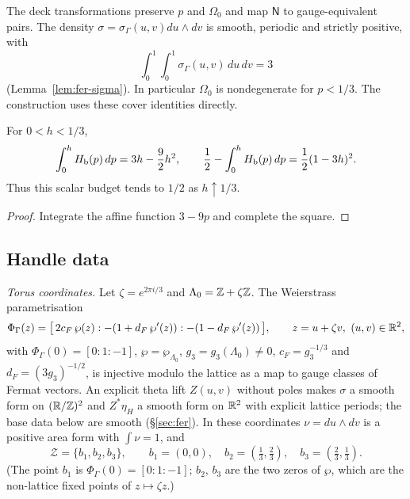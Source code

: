 The deck transformations preserve $p$ and $\Omega_0$ and map $\mathsf N$ to gauge-equivalent pairs.
The density $\sigma=\sigma_\Gamma(u,v)du\wedge dv$ is smooth, periodic and strictly positive, with
\[
 \int_0^1\int_0^1\sigma_\Gamma(u,v)\,du\,dv=3
\]
(Lemma~\ref{lem:fer-sigma}). In particular $\Omega_0$ is nondegenerate for $p<1/3$.
The construction uses these cover identities directly.

\begin{lemma}\label{lem:cub-volume}
For $0<h<1/3$,
\[
 \int_0^hH_{\mathrm b}(p)\,dp=3h-\frac92h^2,\qquad
 \frac12-\int_0^hH_{\mathrm b}(p)\,dp=\frac12(1-3h)^2.
\]
Thus this scalar budget tends to $1/2$ as $h\uparrow1/3$.
\end{lemma}
\begin{proof}
Integrate the affine function $3-9p$ and complete the square.
\end{proof}


\subsection{Handle data}

\emph{Torus coordinates.} Let $\zeta=e^{2\pi i/3}$ and $\Lambda_0=\mathbb{Z}+\zeta\mathbb{Z}$. The Weierstrass parametrisation
\[
 \Phi_\Gamma(z)=\big[\,2c_F\,\wp(z):-(1+d_F\,\wp'(z)):-(1-d_F\,\wp'(z))\,\big],\qquad z=u+\zeta v,\ (u,v)\in\mathbb{R}^2,
\]
with $\Phi_\Gamma(0)=[0:1:-1]$, $\wp=\wp_{\Lambda_0}$, $g_3=g_3(\Lambda_0)\neq0$, $c_F=g_3^{-1/3}$ and
$d_F=(3g_3)^{-1/2}$, is injective modulo the lattice as a map to gauge classes of Fermat vectors. An explicit theta lift $Z(u,v)$ without poles makes $\sigma$ a smooth form on $(\mathbb{R}/\mathbb{Z})^2$ and $Z^*\eta_H$ a smooth form on
$\mathbb{R}^2$ with explicit lattice periods; the base data below are smooth (\S\ref{sec:fer}). In these
coordinates $\nu=du\wedge dv$ is a positive area form with $\int\nu=1$, and
\[
 \mathcal Z=\{b_1,b_2,b_3\},\qquad b_1=(0,0),\quad b_2=(\tfrac13,\tfrac23),\quad b_3=(\tfrac23,\tfrac13).
\]
(The point $b_1$ is $\Phi_\Gamma(0)=[0:1:-1]$; $b_2$, $b_3$ are the two zeros of $\wp$, which are the non-lattice
fixed points of $z\mapsto\zeta z$.)

